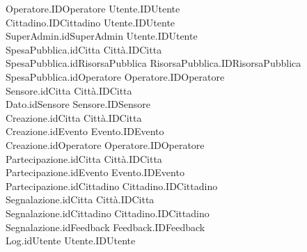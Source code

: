\documentclass{article}
\begin{document}
	Operatore.IDOperatore \faLongArrowRight\space Utente.IDUtente \\
	Cittadino.IDCittadino \faLongArrowRight\space Utente.IDUtente \\
	SuperAdmin.idSuperAdmin \faLongArrowRight\space Utente.IDUtente\\
	SpesaPubblica.idCitta \faLongArrowRight\space Città.IDCitta\\
	SpesaPubblica.idRisorsaPubblica \faLongArrowRight\space RisorsaPubblica.IDRisorsaPubblica\\
	SpesaPubblica.idOperatore \faLongArrowRight\space Operatore.IDOperatore\\
	Sensore.idCitta \faLongArrowRight\space Città.IDCitta\\
	Dato.idSensore \faLongArrowRight\space Sensore.IDSensore\\
	Creazione.idCitta \faLongArrowRight\space Città.IDCitta\\
	Creazione.idEvento \faLongArrowRight\space Evento.IDEvento\\
	Creazione.idOperatore \faLongArrowRight\space Operatore.IDOperatore\\
	Partecipazione.idCitta \faLongArrowRight\space Città.IDCitta\\
	Partecipazione.idEvento \faLongArrowRight\space Evento.IDEvento\\
	Partecipazione.idCittadino \faLongArrowRight\space Cittadino.IDCittadino\\
	Segnalazione.idCitta \faLongArrowRight\space Città.IDCitta\\
	Segnalazione.idCittadino \faLongArrowRight\space Cittadino.IDCittadino\\
	Segnalazione.idFeedback \faLongArrowRight\space Feedback.IDFeedback\\
	Log.idUtente \faLongArrowRight\space Utente.IDUtente
	
\end{document}
